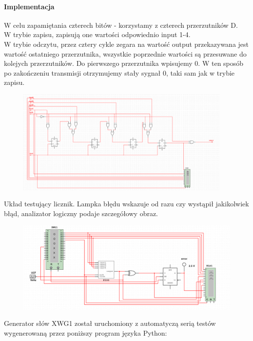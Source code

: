 \documentclass{article}
\begin{document}
\paragraph{Implementacja}
W celu zapamiętania czterech bitów - korzystamy z czterech przerzutników D. \\
W trybie zapisu, zapisują one wartości odpowiednio input 1-4. \\
W trybie odczytu, przez cztery cykle zegara na wartość output przekazywana jest wartość ostatniego przerzutnika, wszystkie poprzednie wartości są przesuwane do kolejych przerzutników.  Do pierwszego przerzutnika wpisujemy 0. W ten sposób po zakończeniu transmisji otrzymujemy stały sygnał 0, taki sam jak w trybie zapisu.
\begin{figure}[H]
\includegraphics[width = 0.95\textwidth]{ukladPiso}
\end{figure}
\newpage
Układ testujący licznik. Lampka błędu wskazuje od razu czy wystąpił jakikolwiek błąd, analizator logiczny podaje szczegółowy obraz.
\begin{figure}[H]
\includegraphics[width = \textwidth]{ukladTesty_1}
\end{figure}
Generator słów XWG1 został uruchomiony z automatyczą serią testów wygenerowaną przez poniższy program języka Python:\\
\end{document}
